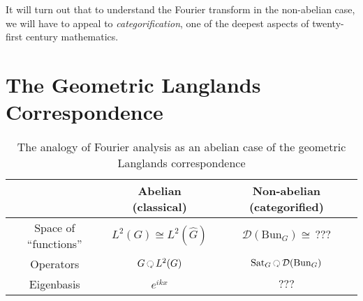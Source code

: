 It will turn out that to understand the Fourier transform in the non-abelian case, we will have to appeal to \emph{categorification}, one of the deepest aspects of twenty-first century mathematics.


\section{The Geometric Langlands Correspondence} %
\label{sec:the_geometric_langlands_correspondence}


\begin{table}[h!]
	\centering
\begin{tabular}{|c|c|c|}
	& Abelian (classical) & Non-abelian (categorified)\\
	\hline
	Space of ``functions'' & $L^2(G) \cong L^2(\hat G)$ & $\mathcal D (\mathrm{Bun}_G) \cong \, ???$\\
	Operators & $G \lacts L^2(G)$ & $\mathrm{Sat}_G \lacts \mathcal D (\mathrm{Bun}_G)$\\
	Eigenbasis & $e^{ikx}$ & $???$
	\end{tabular}
\caption{The analogy of Fourier analysis as an abelian case of the geometric Langlands correspondence}
\label{table:fourier}
\end{table}


